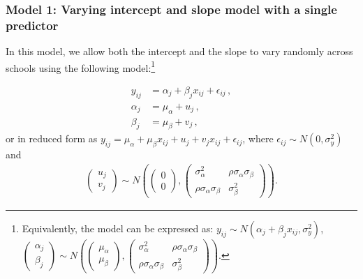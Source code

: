 \subsubsection*{Model 1: Varying intercept and slope model with a single predictor}
In this model, we allow both the intercept and the slope to vary randomly across schools using the following model:\footnote{Equivalently, the model can be expressed as: $y_{ij}\sim N(\alpha_{j}+\beta_{j}x_{ij} , \sigma_y ^2 )$, $\left( \begin{matrix} \alpha _{ j } \\ \beta _{ j } \end{matrix} \right) \sim N\left( \left( \begin{matrix} { \mu  }_{ \alpha  } \\ { \mu  }_{ \beta  } \end{matrix} \right) , \left( \begin{matrix} { \sigma  }_{ \alpha  }^{ 2 } & \rho { \sigma  }_{ \alpha  }{ \sigma  }_{ \beta  } \\ \rho { \sigma  }_{ \alpha  }{ \sigma  }_{ \beta  } & { \sigma  }_{ \beta  }^{ 2 } \end{matrix} \right)  \right).$}

\begin{align}
	y_{ij} &= \alpha_j + \beta_j x_{ij} +\epsilon_{ij} \,, \\
	\alpha_j &= \mu_\alpha + u_j \,, \\
	\beta_j &= \mu_\beta + v_j \,,
\end{align}
or in reduced form as $y_{ij} = \mu_\alpha + \mu_\beta x_{ij} + u_j + v_j x_{ij} + \epsilon_{ij}$, where $\epsilon_{ij} \sim N(0, \sigma_{y}^{2})$ and
\begin{align}
\left( \begin{matrix} u_j \\ v_j \end{matrix} \right) \sim N\left( \left( \begin{matrix} 0 \\ 0 \end{matrix} \right) ,\left( \begin{matrix} { \sigma  }_{ \alpha  }^{ 2 } & \rho { \sigma  }_{ \alpha  }{ \sigma  }_{ \beta  } \\ \rho { \sigma  }_{ \alpha  }{ \sigma  }_{ \beta  } & { \sigma  }_{ \beta  }^{ 2 } \end{matrix} \right)  \right).
\end{align}

\newpage


